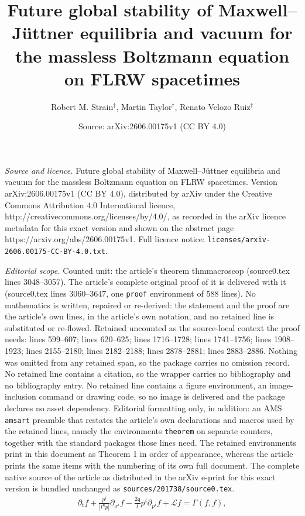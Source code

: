 \documentclass[10pt,a4paper]{amsart}
\title{Future global stability of Maxwell--J{\"u}ttner equilibria and vacuum for the massless Boltzmann equation on FLRW spacetimes}
\author{Robert M. Strain$^{\ddagger}$, Martin Taylor$^{\dagger}$, Renato Velozo Ruiz$^{\dagger}$}
\date{Source: arXiv:2606.00175v1 (CC BY 4.0)}
\newcommand{\linL}{\mathcal{L}}
\newcommand{\pv}{p}
\newcommand{\qq}{\mathfrak{q}}
\newcommand{\tq}{t^{\qq}}
\begin{document}
\maketitle

\noindent\emph{Source and licence.} Future global stability of Maxwell--J{\"u}ttner equilibria and vacuum for the massless Boltzmann equation on FLRW spacetimes. Version arXiv:2606.00175v1 (CC BY 4.0), distributed by arXiv under the Creative Commons Attribution 4.0 International licence, http://creativecommons.org/licenses/by/4.0/, as recorded in the arXiv licence metadata for this exact version and shown on the abstract page https://arxiv.org/abs/2606.00175v1. Full licence notice: \texttt{licenses/arxiv-2606.00175-CC-BY-4.0.txt}.\par\smallskip

\noindent\textit{Editorial scope.} Counted unit: the article's theorem thmmacroscop (source0.tex lines 3048--3057). The article's complete original proof of it is delivered with it (source0.tex lines 3060--3647, one \texttt{proof} environment of 588 lines). No mathematics is written, repaired or re-derived: the statement and the proof are the article's own lines, in the article's own notation, and no retained line is substituted or re-flowed.  Retained uncounted as the source-local context the proof needs: lines 599--607; lines 620--625; lines 1716--1728; lines 1741--1756; lines 1908--1923; lines 2155--2180; lines 2182--2188; lines 2878--2881; lines 2883--2886.  Nothing was omitted from any retained span, so the package carries no omission record.  No retained line contains a citation, so the wrapper carries no bibliography and no bibliography entry.  No retained line contains a figure environment, an image-inclusion command or drawing code, so no image is delivered and the package declares no asset dependency.  Editorial formatting only, in addition: an AMS \texttt{amsart} preamble that restates the article's own declarations and macros used by the retained lines, namely the environments \texttt{theorem} on separate counters, together with the standard packages those lines need.  The retained environments print in this document as Theorem 1 in order of appearance, whereas the article prints the same items with the numbering of its own full document.  The complete native source of the article as distributed in the arXiv e-print for this exact version is bundled unchanged as \texttt{sources/201738/source0.tex}.
\begin{align}
        \partial_t f+ \frac{\pv^i}{|\tq \pv|}\partial_{x^i} f
    -\frac{2\qq }{t} p^i \partial_{p^i} f
    +
    \linL f
=
\Gamma (f,f),
\label{rBoltz00}
\end{align}
\end{document}
